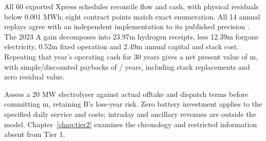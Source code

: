 All 60 exported Xpress schedules reconcile flow and cash, with physical
residuals below 0.001 MWh; eight contract points match exact enumeration.
All 14 annual replays agree with an independent implementation to its
published precision \cite{peer}. The 2023 A gain decomposes into
\gbp 23.97m hydrogen receipts, less \gbp 12.39m forgone electricity,
\gbp 0.52m fixed operation and \gbp 2.49m annual capital and stack cost.
Repeating that year's operating cash for 30 years gives a net present value
of \gbp\NPV m,
with simple/discounted paybacks of \Payback/\DiscountedPayback{} years,
including stack replacements and zero residual value.

Assess a 20 MW electrolyser against actual offtake and dispatch terms before
committing \gbp\Capital m, retaining B's loss-year risk. Zero battery
investment applies to the specified daily service and costs; intraday and
ancillary revenues are outside the model. Chapter~\ref{chap:tier2} examines
the chronology and restricted information absent from Tier 1.
